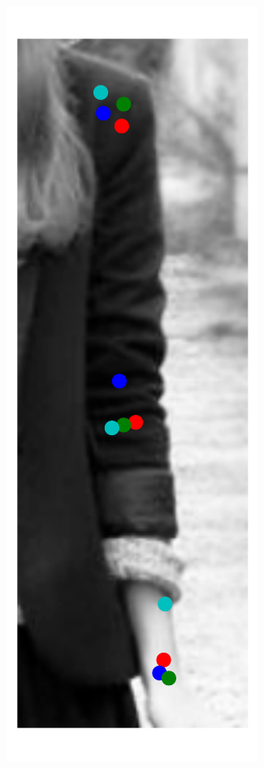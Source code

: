 \begin{figure}[t!]
\begin{subfigure}[b]{0.05\textwidth}
    \end{subfigure}
    \hfill
    \begin{subfigure}[b]{0.05\textwidth}
            \includegraphics[width=\textwidth]{resources/Fig_Variance/image_3}

\end{subfigure}
\end{figure}
